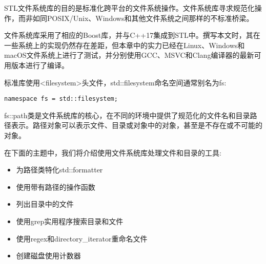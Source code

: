 STL文件系统库的目的是标准化跨平台的文件系统操作。文件系统库寻求规范化操作，而非如同POSIX/Unix、Windows和其他文件系统之间那样的不标准桥梁。

文件系统库采用了相应的Boost库，并与C++17集成到STL中。撰写本文时，其在一些系统上的实现仍然存在差距，但本章中的实力已经在Linux、Windows和macOS文件系统上进行了测试，并分别使用GCC、MSVC和Clang编译器的最新可用版本进行了编译。

标准库使用<filesystem>头文件，std::filesystem命名空间通常别名为fs:

\begin{lstlisting}[style=styleCXX]
namespace fs = std::filesystem;
\end{lstlisting}

fs::path类是文件系统库的核心，在不同的环境中提供了规范化的文件名和目录路径表示。路径对象可以表示文件、目录或对象中的对象，甚至是不存在或不可能的对象。


在下面的主题中，我们将介绍使用文件系统库处理文件和目录的工具:

\begin{itemize}
\item 
为路径类特化std::formatter

\item 
使用带有路径的操作函数

\item 
列出目录中的文件

\item 
使用grep实用程序搜索目录和文件

\item 
使用regex和directory\_iterator重命名文件

\item 
创建磁盘使用计数器
\end{itemize}











